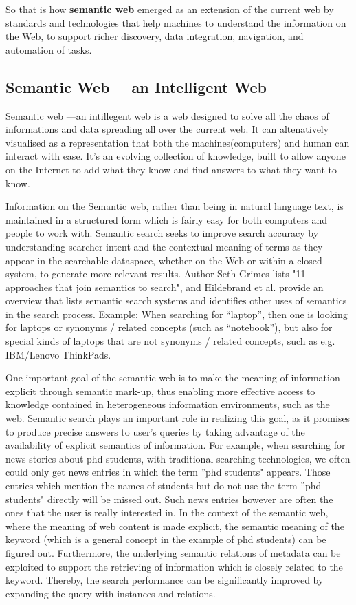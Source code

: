 \documentclass[12pt,a4]{article}
\begin{document}
So that is how \textbf{semantic web} emerged as an extension of the current web by standards and technologies that help machines to understand the information on the Web, to support richer discovery, data integration, navigation, and automation of tasks.

\subsection{Semantic Web ---an Intelligent Web}
Semantic web ---an intillegent web is a web designed to solve all the chaos of informations and data spreading all over the current web. It can altenatively visualised as a representation that both the machines(computers) and human can interact with ease. It's an evolving collection of knowledge, built to allow anyone on the Internet to add what they know and find answers to what they want to know.


 Information on the Semantic web, rather than being in natural language text, is maintained in a structured form which is fairly easy for both computers and people to work with. 
 Semantic search seeks to improve search accuracy by understanding searcher intent and the contextual meaning of terms as they appear in the searchable dataspace, whether on the Web or within a closed system, to generate more relevant results. Author Seth Grimes lists "11 approaches that join semantics to search", and Hildebrand et al. provide an overview that lists semantic search systems and identifies other uses of semantics in the search process.
Example:
When searching for “laptop”, then one is looking for laptops or
synonyms / related concepts (such as “notebook”), but also for
special kinds of laptops that are not synonyms / related
concepts, such as e.g. IBM/Lenovo ThinkPads.

One important goal of the semantic web is to make the meaning of information explicit through semantic mark-up, thus enabling more effective access to knowledge contained in heterogeneous information environments, such as the web. Semantic search plays an important role in realizing this goal, as it promises to produce precise answers to user’s queries by taking advantage of the availability of explicit semantics of information. For example, when searching for news stories about phd students, with traditional searching technologies, we often could only get news entries in which the term ''phd students" appears. Those entries which mention the names of students but do not use the term ''phd students" directly will be missed out. Such news entries however are often the ones that the user is really interested in. In the context of the semantic web, where the meaning of web content is made explicit, the semantic meaning of the keyword (which is a general concept in the example of phd students) can be figured out. Furthermore, the underlying semantic relations of metadata can be exploited to support the retrieving of information which is closely related to the keyword. Thereby, the search performance can be significantly improved by expanding the query with instances and relations.
\end{document}
